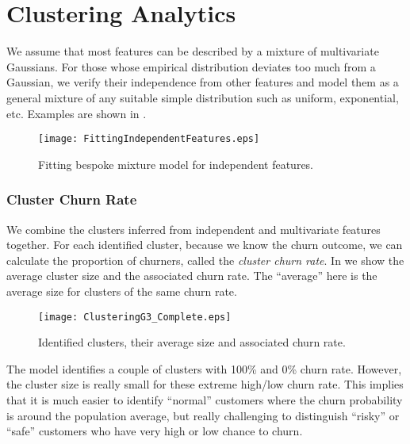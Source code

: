 \documentclass[english,a4,oneside,9pt]{extarticle}
\begin{document}
\section{Clustering Analytics}

We assume that most features can be described by a mixture of multivariate Gaussians. For those whose empirical distribution deviates too much from a Gaussian, we verify their independence from other features and model them as a general mixture of any suitable simple distribution such as uniform, exponential, etc. Examples are shown in .

\begin{figure}[!h]
\centering
\vspace*{-3mm}
\texttt{[image: FittingIndependentFeatures.eps]}
\caption{Fitting bespoke mixture model for independent features. }
\label{fig:fitIndependentFeature}
\end{figure}

\vspace*{-3mm}
\subsubsection*{Cluster Churn Rate}

We combine the clusters inferred from independent and multivariate features together. For each identified cluster, because we know the churn outcome, we can calculate the proportion of churners, called the \textit{cluster churn rate}. In  we show the average cluster size and the associated churn rate. The ``average'' here is the average size for clusters of the same churn rate.

\begin{figure}[htb]
\centering
\vspace*{-3mm}
\texttt{[image: ClusteringG3\_Complete.eps]}
\vspace*{-3mm}
\caption{Identified clusters, their average size and associated churn rate.}
\label{fig:cluster}
\end{figure}

The model identifies a couple of clusters with 100\% and 0\% churn rate. However, the cluster size is really small for these extreme high/low churn rate. This implies that it is much easier to identify ``normal'' customers where the churn probability is around the population average, but really challenging to distinguish ``risky'' or ``safe'' customers who have very high or low chance to churn.
\end{document}
